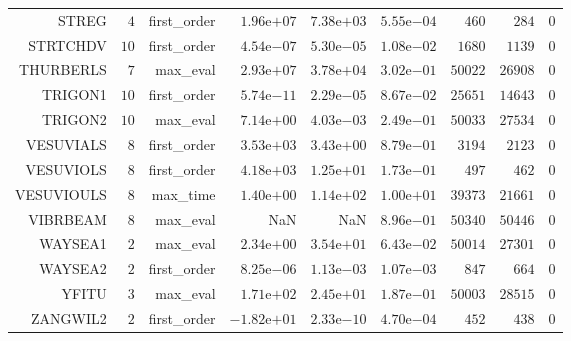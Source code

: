 \begin{longtable}{rrrrrrrrr}
STREG & \(     4\) & first\_order & \( 1.96\)e\(+07\) & \( 7.38\)e\(+03\) & \( 5.55\)e\(-04\) & \(   460\) & \(   284\) & \(     0\) \\
STRTCHDV & \(    10\) & first\_order & \( 4.54\)e\(-07\) & \( 5.30\)e\(-05\) & \( 1.08\)e\(-02\) & \(  1680\) & \(  1139\) & \(     0\) \\
THURBERLS & \(     7\) & max\_eval & \( 2.93\)e\(+07\) & \( 3.78\)e\(+04\) & \( 3.02\)e\(-01\) & \( 50022\) & \( 26908\) & \(     0\) \\
TRIGON1 & \(    10\) & first\_order & \( 5.74\)e\(-11\) & \( 2.29\)e\(-05\) & \( 8.67\)e\(-02\) & \( 25651\) & \( 14643\) & \(     0\) \\
TRIGON2 & \(    10\) & max\_eval & \( 7.14\)e\(+00\) & \( 4.03\)e\(-03\) & \( 2.49\)e\(-01\) & \( 50033\) & \( 27534\) & \(     0\) \\
VESUVIALS & \(     8\) & first\_order & \( 3.53\)e\(+03\) & \( 3.43\)e\(+00\) & \( 8.79\)e\(-01\) & \(  3194\) & \(  2123\) & \(     0\) \\
VESUVIOLS & \(     8\) & first\_order & \( 4.18\)e\(+03\) & \( 1.25\)e\(+01\) & \( 1.73\)e\(-01\) & \(   497\) & \(   462\) & \(     0\) \\
VESUVIOULS & \(     8\) & max\_time & \( 1.40\)e\(+00\) & \( 1.14\)e\(+02\) & \( 1.00\)e\(+01\) & \( 39373\) & \( 21661\) & \(     0\) \\
VIBRBEAM & \(     8\) & max\_eval &       NaN &       NaN & \( 8.96\)e\(-01\) & \( 50340\) & \( 50446\) & \(     0\) \\
WAYSEA1 & \(     2\) & max\_eval & \( 2.34\)e\(+00\) & \( 3.54\)e\(+01\) & \( 6.43\)e\(-02\) & \( 50014\) & \( 27301\) & \(     0\) \\
WAYSEA2 & \(     2\) & first\_order & \( 8.25\)e\(-06\) & \( 1.13\)e\(-03\) & \( 1.07\)e\(-03\) & \(   847\) & \(   664\) & \(     0\) \\
YFITU & \(     3\) & max\_eval & \( 1.71\)e\(+02\) & \( 2.45\)e\(+01\) & \( 1.87\)e\(-01\) & \( 50003\) & \( 28515\) & \(     0\) \\
ZANGWIL2 & \(     2\) & first\_order & \(-1.82\)e\(+01\) & \( 2.33\)e\(-10\) & \( 4.70\)e\(-04\) & \(   452\) & \(   438\) & \(     0\) \\\hline
\end{longtable}

